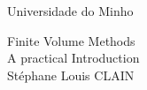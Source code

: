 
\thispagestyle{empty}

\phantom{a}
\hskip 0cm {\introfontb Universidade do Minho}

\vskip 6cm
\hskip 5.0cm 
{\introfonta Finite Volume Methods }\\
\vskip 1cm
\hskip 3.0cm 
{\introfontb A practical Introduction }\\ 
\vskip 10cm
\hskip 7cm{\sc \huge St\'ephane Louis CLAIN}


\newpage \thispagestyle{empty} \mbox{} 
